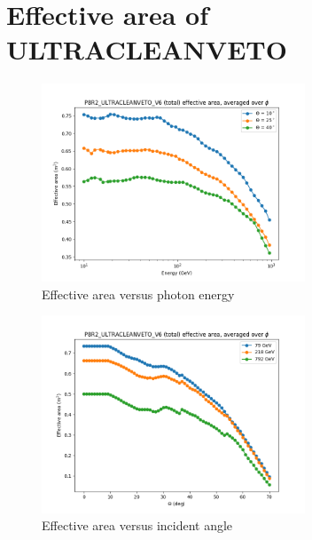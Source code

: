 \chapter{Effective area of ULTRACLEANVETO}
\label{appendix:cleanveto_eff_area}


\begin{figure}[h]
    \centering
    \includegraphics[width=0.7\textwidth]{appendix/effective_area/figures/custom_eff_energy.png}
    \caption{Effective area versus photon energy}
    \label{fig:cleanveto_eff_e}
\end{figure}


\begin{figure}[h]
    \centering
    \includegraphics[width=0.7\textwidth]{appendix/effective_area/figures/custom_eff_theta.png}
    \caption{Effective area versus incident angle}
    \label{fig:cleanveto_eff_theta}
\end{figure}
